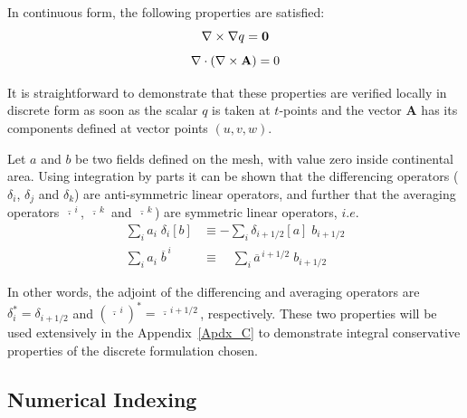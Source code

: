 In continuous form, the following properties are satisfied:
\begin{equation} \label{Eq_DOM_curl_grad}
\nabla \times \nabla q ={\rm {\bf {0}}}
\end{equation}
\begin{equation} \label{Eq_DOM_div_curl}
\nabla \cdot \left( {\nabla \times {\rm {\bf A}}} \right)=0
\end{equation}

It is straightforward to demonstrate that these properties are verified locally in 
discrete form as soon as the scalar $q$ is taken at $t$-points and the vector 
\textbf{A} has its components defined at vector points $(u,v,w)$.

Let $a$ and $b$ be two fields defined on the mesh, with value zero inside 
continental area. Using integration by parts it can be shown that the differencing 
operators ($\delta_i$, $\delta_j$ and $\delta_k$) are anti-symmetric linear 
operators, and further that the averaging operators $\overline{\,\cdot\,}^{\,i}$, 
$\overline{\,\cdot\,}^{\,k}$ and $\overline{\,\cdot\,}^{\,k}$) are symmetric linear 
operators, $i.e.$
\begin{align} 
\label{DOM_di_adj}
\sum\limits_i { a_i \;\delta _i \left[ b \right]} 
	&\equiv -\sum\limits_i {\delta _{i+1/2} \left[ a \right]\;b_{i+1/2} }      \\
\label{DOM_mi_adj}
\sum\limits_i { a_i \;\overline b^{\,i}} 
	& \equiv \quad \sum\limits_i {\overline a ^{\,i+1/2}\;b_{i+1/2} } 
\end{align}

In other words, the adjoint of the differencing and averaging operators are 
$\delta_i^*=\delta_{i+1/2}$ and 
${(\overline{\,\cdot \,}^{\,i})}^*= \overline{\,\cdot\,}^{\,i+1/2}$, respectively. 
These two properties will be used extensively in the Appendix~\ref{Apdx_C} to 
demonstrate integral conservative properties of the discrete formulation chosen.

\subsection{Numerical Indexing}
\label{DOM_Num_Index}


